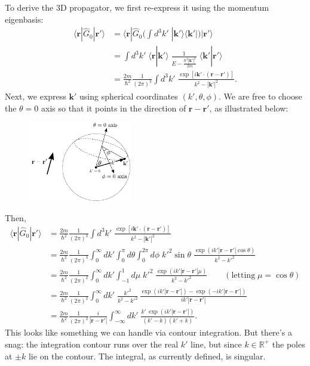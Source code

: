\documentclass[pra,12pt]{revtex4-2}
\begin{document}
To derive the 3D propagator, we first re-express it using the momentum
eigenbasis:
\begin{align}
  \langle\mathbf{r}|\hat{G}_0|\mathbf{r}'\rangle
  &= \langle\mathbf{r}|\hat{G}_0 \Big(\int d^3k'\; |\mathbf{k}'\rangle\langle\mathbf{k}'| \Big) |\mathbf{r}'\rangle \nonumber \\
  &= \int d^3k' \; \langle\mathbf{r}|\mathbf{k}'\rangle \;
  \frac{1}{E-\frac{\hbar^2|\mathbf{k}'|^2}{2m}} \;
  \langle\mathbf{k}'|\mathbf{r}'\rangle \nonumber \\
  &= \frac{2m}{\hbar^2} \frac{1}{(2\pi)^3} \int d^3k' \;
  \frac{\exp\left[i\mathbf{k}' \cdot
      (\mathbf{r}-\mathbf{r}')\right]}{k^2-|\mathbf{k}'|^2}.
  \label{rGr}
\end{align}
Next, we express $\mathbf{k}'$ using spherical coordinates
$(k',\theta,\phi)$.  We are free to choose the $\theta=0$ axis so that
it points in the direction of $\mathbf{r}-\mathbf{r}'$, as illustrated
below:

\begin{figure}[h]
  \centering\includegraphics[width=0.4\textwidth]{spherical_coords}
\end{figure}

\noindent
Then,
\begin{align}
  \langle\mathbf{r}|\hat{G}_0|\mathbf{r}'\rangle &= \frac{2m}{\hbar^2} \frac{1}{(2\pi)^3} \int d^3k' \; \frac{\exp\left[i\mathbf{k}'\cdot (\mathbf{r}-\mathbf{r}')\right]}{k^2-|\mathbf{k}'|^2} \nonumber \\
  &= \frac{2m}{\hbar^2} \frac{1}{(2\pi)^3} \int_0^\infty dk' \int_0^\pi d\theta \int_{0}^{2\pi} d\phi \;{k'}^{2}\sin\theta\; \frac{\displaystyle \exp\left(ik'|\mathbf{r}-\mathbf{r}'|\cos\theta\right)}{k^2-{k'}^2} \nonumber \\
  &= \frac{2m}{\hbar^2} \frac{1}{(2\pi)^2} \int_0^\infty dk' \int_{-1}^1 d\mu \;{k'}^2\; \frac{\displaystyle \exp\left(ik'|\mathbf{r}-\mathbf{r}'|\mu\right)}{k^2-{k'}^2} \qquad(\text{letting}\;\mu = \cos\theta) \nonumber \\
  &= \frac{2m}{\hbar^2} \frac{1}{(2\pi)^2} \int_0^\infty dk' \; \frac{ {k'}^2}{k^2-{k'}^2}\, \frac{\displaystyle \exp\left(ik'|\mathbf{r}-\mathbf{r}'|\right) - \exp\left(-ik'|\mathbf{r}-\mathbf{r}'|\right)}{ik'|\mathbf{r}-\mathbf{r}'|} \nonumber\\
  &= \frac{2m}{\hbar^2} \frac{1}{(2\pi)^2} \frac{i}{|\mathbf{r}-\mathbf{r}'|} \int_{-\infty}^\infty dk' \; \frac{\displaystyle k'\, \exp\left(ik'|\mathbf{r}-\mathbf{r}'|\right)}{(k' - k)(k'+k)}.
  \label{rGrintegrand}
\end{align}
This looks like something we can handle via contour integration.  But
there's a snag: the integration contour runs over the real $k'$ line,
but since $k \in \mathbb{R}^+$ the poles at $\pm k$ lie on the
contour.  The integral, as currently defined, is singular.
\end{document}
